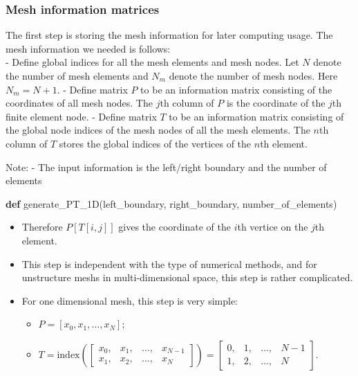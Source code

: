 \documentclass[11pt]{article}
\providecommand{\tightlist}{%
      \setlength{\itemsep}{0pt}\setlength{\parskip}{0pt}}
\newenvironment{Shaded}{}{}
\newcommand{\KeywordTok}[1]{\textcolor[rgb]{0.00,0.44,0.13}{\textbf{{#1}}}}
\newcommand{\NormalTok}[1]{{#1}}
\begin{document}
    \subsubsection{Mesh information
matrices}\label{mesh-information-matrices}

The first step is storing the mesh information for later computing
usage. The mesh information we needed is follows:\\
- Define global indices for all the mesh elements and mesh nodes. Let
\(N\) denote the number of mesh elements and \(N_m\) denote the number
of mesh nodes. Here \(N_m = N + 1\). - Define matrix \(P\) to be an
information matrix consisting of the coordinates of all mesh nodes. The
\(j\)th column of \(P\) is the coordinate of the \(j\)th finite element
node. - Define matrix \(T\) to be an information matrix consisting of
the global node indices of the mesh nodes of all the mesh elements. The
\(n\)th column of \(T\) stores the global indices of the vertices of the
\(n\)th element.

    Note: - The input information is the left/right boundary and the number
of elements

\begin{Shaded}
\begin{Highlighting}[]
    \KeywordTok{def}\NormalTok{ generate_PT_1D(left_boundary, right_boundary, number_of_elements)}
\end{Highlighting}
\end{Shaded}

\begin{itemize}
\tightlist
\item
  Therefore \(P[T[i,j]]\) gives the coordinate of the \(i\)th vertice on
  the \(j\)th element.
\item
  This step is independent with the type of numerical methods, and for
  unstructure meshs in multi-dimensional space, this step is rather
  complicated.
\item
  For one dimensional mesh, this step is very simple:

  \begin{itemize}
  \tightlist
  \item
    \(P = [x_0, x_1, \ldots, x_N]\);
  \item
    \(T = \text{index}\left(\left[\begin{array}{cccc}x_0, & x_1, & \ldots, & x_{N-1}\\  x_1, & x_2, & \ldots, & x_N\end{array}\right]\right) = \left[\begin{array}{cccc}0, & 1, & \ldots, & N-1\\  1, & 2, & \ldots, & N\end{array}\right]\).
  \end{itemize}
\end{itemize}
\end{document}
